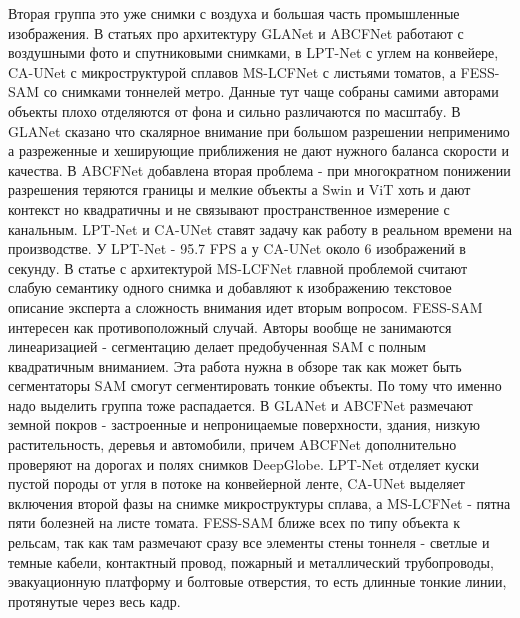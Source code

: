 \documentclass[areasetadvanced]{scrartcl}
\begin{document}
		Вторая группа это уже снимки с воздуха и большая часть промышленные изображения. В статьях про архитектуру GLANet \cite{glanet} и ABCFNet \cite{abcfnet} работают с
		воздушными фото и спутниковыми снимками, в LPT-Net \cite{lptnet} с углем на конвейере, CA-UNet \cite{caunet} с микроструктурой
		сплавов MS-LCFNet \cite{mslcfnet} с листьями томатов, а FESS-SAM \cite{fesssam} со снимками тоннелей метро. Данные тут чаще собраны самими
		авторами объекты плохо отделяются от фона и сильно различаются по масштабу. В GLANet \cite{glanet} сказано что скалярное внимание при
		большом разрешении неприменимо а разреженные и хеширующие приближения не дают нужного баланса скорости и качества. В ABCFNet \cite{abcfnet}
		добавлена вторая проблема - при многократном понижении разрешения теряются границы и мелкие объекты а Swin и ViT хоть и дают контекст
		но квадратичны и не связывают пространственное измерение с канальным. LPT-Net \cite{lptnet} и CA-UNet \cite{caunet} ставят задачу как работу в
		реальном времени на производстве. У LPT-Net - 95.7 FPS а у CA-UNet около 6 изображений в секунду.
		В статье с архитектурой MS-LCFNet \cite{mslcfnet} главной проблемой считают слабую семантику одного снимка и добавляют к изображению
		текстовое описание эксперта а сложность внимания идет вторым вопросом. FESS-SAM \cite{fesssam} интересен как противоположный случай. Авторы
		вообще не занимаются линеаризацией - сегментацию делает предобученная SAM с полным
		квадратичным вниманием. Эта работа нужна в обзоре так как может быть сегментаторы SAM смогут сегментировать тонкие объекты.
		По тому что именно надо выделить группа тоже распадается. В GLANet \cite{glanet} и ABCFNet \cite{abcfnet} размечают земной покров -
		застроенные и непроницаемые поверхности, здания, низкую растительность, деревья и автомобили, причем ABCFNet дополнительно проверяют на дорогах
		и полях снимков DeepGlobe. LPT-Net \cite{lptnet} отделяет куски пустой породы от угля в потоке на конвейерной ленте, CA-UNet \cite{caunet}
		выделяет включения второй фазы на снимке микроструктуры сплава, а MS-LCFNet \cite{mslcfnet} - пятна пяти болезней на листе томата.
		FESS-SAM \cite{fesssam} ближе всех по типу объекта к рельсам, так как там размечают сразу все элементы стены тоннеля - светлые и темные кабели,
		контактный провод, пожарный и металлический трубопроводы, эвакуационную платформу и болтовые отверстия, то есть длинные тонкие линии,
		протянутые через весь кадр.
\end{document}
